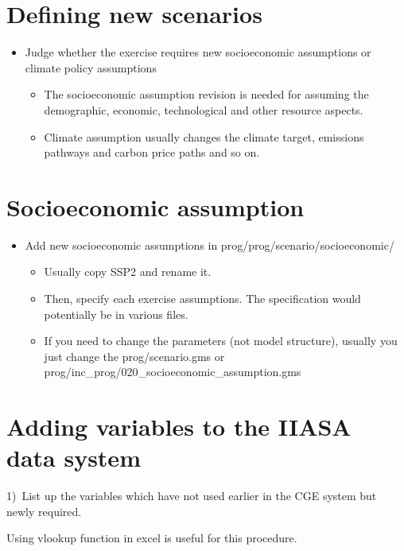 \documentclass[10pt,a4paper,titlepage,dvipdfmx]{book}
\begin{document}
\section{\label{sec:DefNewSce}Defining new scenarios}


\begin{itemize}
\item Judge whether the exercise requires new socioeconomic assumptions or climate policy assumptions
\begin{itemize}
\item The socioeconomic assumption revision is needed for assuming the demographic, economic, technological and other resource aspects.
\item Climate assumption usually changes the climate target, emissions pathways and carbon price paths and so on.
\end{itemize}

\end{itemize}
\section{\label{sec:SomeTIPS-SocAss}Socioeconomic assumption}


\begin{itemize}
\item Add new socioeconomic assumptions in prog/prog/scenario/socioeconomic/
\begin{itemize}
\item Usually copy SSP2 and rename it.
\item Then, specify each exercise assumptions. The specification would potentially be in various files.

\item If you need to change the parameters (not model structure), usually you just change the prog/scenario.gms or prog/inc\_prog/020\_socioeconomic\_assumption.gms
\end{itemize}

\end{itemize}
\section{\label{sec:AddVarIIADatSys}Adding variables to the IIASA data system}

1)~List up the variables which have not used earlier in the CGE system but newly required.\label{mark-1)}

Using vlookup function in excel is useful for this procedure.
\end{document}
